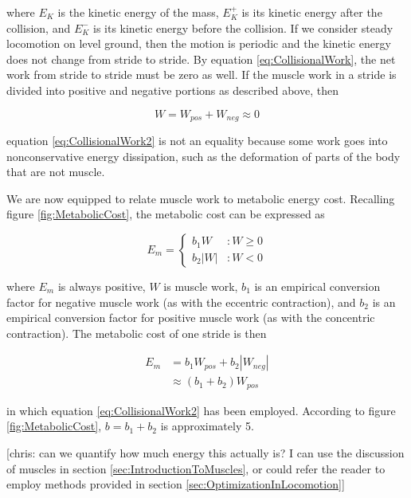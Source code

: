 where $E_{K}$ is the kinetic energy of the mass, $E_{K}^{+}$ is its kinetic energy after the collision, and $E_{K}^{-}$ is its kinetic energy before the collision. If we consider steady locomotion on level ground, then the motion is periodic and the kinetic energy does not change from stride to stride. By equation \ref{eq:CollisionalWork}, the net work from stride to stride must be zero as well. If the muscle work in a stride is divided into positive and negative portions as described above, then

\begin{equation}
W = W_{pos} + W_{neg} \approx 0
\label{eq:CollisionalWork2}
\end{equation}

equation \ref{eq:CollisionalWork2} is not an equality because some work goes into nonconservative energy dissipation, such as the deformation of parts of the body that are not muscle.

We are now equipped to relate muscle work to metabolic energy cost. Recalling figure \ref{fig:MetabolicCost}, the metabolic cost can be expressed as

\begin{displaymath}
   E_{m} = \left\{
     \begin{array}{lr}
       b_{1} W & : W \geq 0\\
       b_{2} |W| & : W < 0
     \end{array}
   \right.
\end{displaymath}

where $E_{m}$ is always positive, $W$ is muscle work, $b_{1}$ is an empirical conversion factor for negative muscle work (as with the eccentric contraction), and $b_{2}$ is an empirical conversion factor for positive muscle work (as with the concentric contraction). The metabolic cost of one stride is then

\begin{align}
E_{m} &= b_{1} W_{pos} + b_{2} |W_{neg}| \\
&\approx (b_{1} + b_{2})W_{pos}
\end{align}

in which equation \ref{eq:CollisionalWork2} has been employed. According to figure \ref{fig:MetabolicCost}, $b = b_{1} + b_{2}$ is approximately 5.

[chris: can we quantify how much energy this actually is? I can use the discussion of muscles in section \ref{sec:IntroductionToMuscles}, or could refer the reader to employ methods provided in section \ref{sec:OptimizationInLocomotion}]

